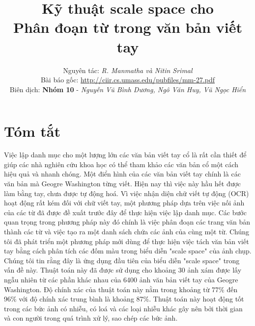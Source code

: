 \documentclass[a4paper]{article}
\title {
    Kỹ thuật scale space cho\\
    Phân đoạn từ trong văn bản viết tay
}
\author {
    Nguyên tác: \textit{R. Manmatha và Nitin Srimal}\\
    Bài báo gốc: \url{http://ciir.cs.umass.edu/pubfiles/mm-27.pdf}\\
    Biên dịch: \textbf{Nhóm 10} - \textit{Nguyễn Vũ Bình Dương, Ngô Văn Huy, Vũ Ngọc Hiển}
}
\begin{document}
\maketitle
\pagebreak

\tableofcontents
\pagebreak

\section*{Tóm tắt}
Việc lập danh mục cho một lượng lớn các văn bản viết tay cổ là rất cần thiết để giúp các nhà nghiên cứu khoa học có thể tham khảo các văn bản cổ một cách hiệu quả và nhanh chóng. Một điển hình của các văn bản viết tay chính là các văn bản mà Geogre Washington từng viết. Hiện nay thì việc này hầu hết được làm bằng tay, chưa được tự động hoá. Vì việc nhận diện chữ viết tự động (OCR) hoạt động rất kém đối với chữ viết tay, một phương pháp dựa trên việc nối ảnh của các từ đã được đề xuất trước đây để thực hiện việc lập danh mục. Các bước quan trọng trong phương pháp này đó chính là việc phân đoạn các trang văn bản thành các từ và việc tạo ra một danh sách chứa các ảnh của cùng một từ. Chúng tôi đã phát triển một phương pháp mới dùng để thực hiện việc tách văn bản viết tay bằng cách phân tích các đốm màu trong biểu diễn "scale space" của ảnh chụp. Chúng tôi tin rằng đây là ứng dụng đầu tiên của biểu diễn "scale space" trong vấn đề này. Thuật toán này đã được sử dụng cho khoảng 30 ảnh xám được lấy ngẫu nhiên từ các phần khác nhau của 6400 ảnh văn bản viết tay của Geogre Washington. Độ chính xác của thuật toán này nằm trong khoảng từ 77\% đến 96\% với độ chính xác trung bình là khoảng 87\%. Thuật toán này hoạt động tốt trong các bức ảnh có nhiễu, có loá và các loại nhiễu khác gây nên bởi thời gian và con người trong quá trình xử lý, sao chép các bức ảnh.
\end{document}

